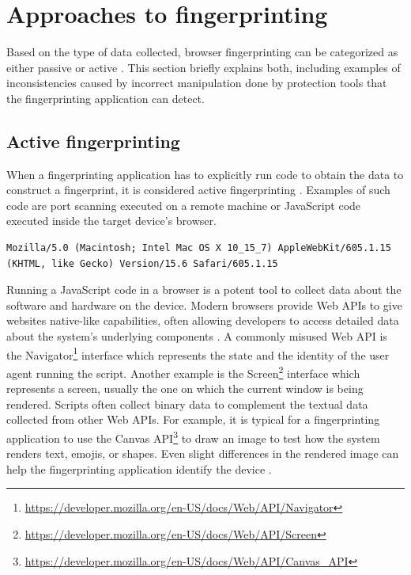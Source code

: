 \section{Approaches to fingerprinting}
\label{Section:FingerprintingApproaches}

Based on the type of data collected, browser fingerprinting can be categorized as either passive or active \cite{JShelterPaper}. This section briefly explains both, including examples of inconsistencies caused by incorrect manipulation done by protection tools that the fingerprinting application can detect.

\subsection{Active fingerprinting}

When a fingerprinting application has to explicitly run code to obtain the data to construct a fingerprint, it is considered active fingerprinting \cite{JShelterPaper}. Examples of such code are port scanning executed on a remote machine or JavaScript code executed inside the target device's browser.

\bigbreak

\begin{lstlisting}[caption={An example of Safari User-Agent string.}, label={Listing:UserAgentSafariFingerprinting}]
Mozilla/5.0 (Macintosh; Intel Mac OS X 10_15_7) AppleWebKit/605.1.15 (KHTML, like Gecko) Version/15.6 Safari/605.1.15
\end{lstlisting}

\medbreak

Running a JavaScript code in a browser is a potent tool to collect data about the software and hardware on the device. Modern browsers provide Web APIs to give websites native-like capabilities, often allowing developers to access detailed data about the system's underlying components \cite{VondracekDP}. A commonly misused Web API is the Navigator\footnote{\url{https://developer.mozilla.org/en-US/docs/Web/API/Navigator}} interface which represents the state and the identity of the user agent running the script. Another example is the Screen\footnote{\url{https://developer.mozilla.org/en-US/docs/Web/API/Screen}} interface which represents a screen, usually the one on which the current window is being rendered. Scripts often collect binary data to complement the textual data collected from other Web APIs. For example, it is typical for a fingerprinting application to use the Canvas API\footnote{\url{https://developer.mozilla.org/en-US/docs/Web/API/Canvas_API}} to draw an image to test how the system renders text, emojis, or shapes. Even slight differences in the rendered image can help the fingerprinting application identify the device \cite{VondracekDP}.

